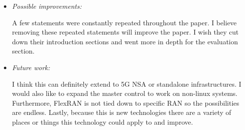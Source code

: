 \documentclass[letterpaper,twocolumn,10pt]{article}
\begin{document}
\begin{itemize}
\item {\it Possible improvements:} 

A few statements were constantly repeated throughout the paper. I believe removing these repeated statements will 
improve the paper. I wish they cut down their introduction sections and went more in depth for the evaluation section. 

\item {\it Future work:} 

I think this can definitely extend to 5G NSA or standalone infrastructures. I would also like to expand the master control
to work on non-linux systems. Furthermore, FlexRAN is not tied down to specific RAN so the possibilities are endless. Lastly,
because this is new technologies there are a variety of places or things this technology could apply to and improve.

\end{itemize}

{
  \small 
  
  
}
\end{document}
